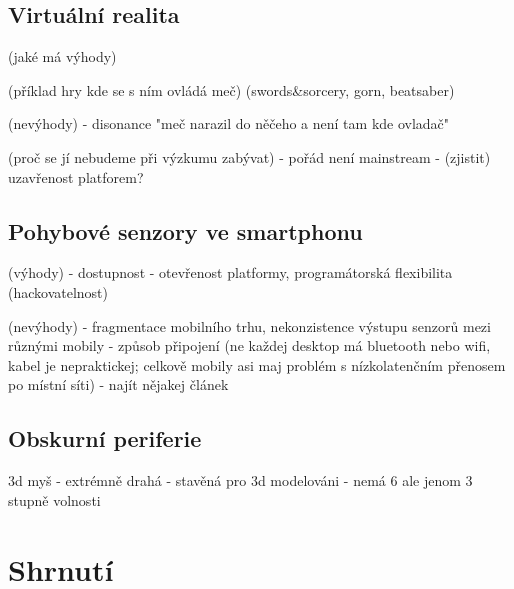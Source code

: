 \subsection{Virtuální realita}

(jaké má výhody)

(příklad hry kde se s ním ovládá meč) (swords\&sorcery, gorn, beatsaber)

(nevýhody)
- disonance "meč narazil do něčeho a není tam kde ovladač"

(proč se jí nebudeme při výzkumu zabývat)
- pořád není mainstream
- (zjistit) uzavřenost platforem?


\subsection{Pohybové senzory ve smartphonu}

(výhody)
- dostupnost
- otevřenost platformy, programátorská flexibilita (hackovatelnost)

(nevýhody)
- fragmentace mobilního trhu, nekonzistence výstupu senzorů mezi různými mobily
- způsob připojení (ne každej desktop má bluetooth nebo wifi, kabel je nepraktickej; celkově mobily asi maj problém s nízkolatenčním přenosem po místní síti)
- najít nějakej článek

\subsection{Obskurní periferie}

3d myš
- extrémně drahá 
- stavěná pro 3d modelováni
- nemá 6 ale jenom 3 stupně volnosti


\section{Shrnutí}
